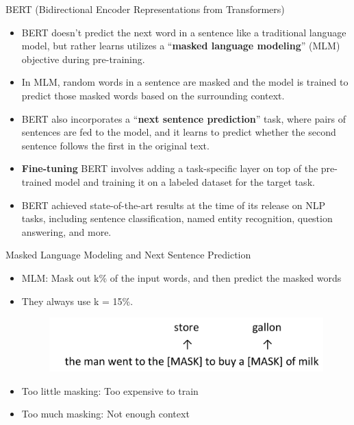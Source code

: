 \documentclass[handout]{beamer}
\begin{document}
\begin{frame}{BERT (Bidirectional Encoder Representations from Transformers)}
\begin{scriptsize}
\begin{itemize}
\item BERT  doesn't predict the next word in a sentence like a traditional language model, but rather learns utilizes a ``\textbf{masked language modeling}'' (MLM) objective during pre-training.

\item In MLM, random words in a sentence are masked and the model is trained to predict those masked words based on the surrounding context.
\item BERT also incorporates a ``\textbf{next sentence prediction}'' task, where pairs of sentences are fed to the model, and it learns to predict whether the second sentence follows the first in the original text.
\item \textbf{Fine-tuning} BERT involves adding a task-specific layer on top of the pre-trained model and training it on a labeled dataset for the target task.
\item BERT achieved state-of-the-art results at the time of its release on NLP tasks, including sentence classification, named entity recognition, question answering, and more.





\end{itemize}
\end{scriptsize}
\end{frame}


\begin{frame}{Masked Language Modeling and Next Sentence Prediction}
\begin{scriptsize}
\begin{itemize}
\item MLM: Mask out k\% of the input words, and then predict the masked words
\item They always use k = 15\%.

     \begin{figure}[h]
        	\includegraphics[scale = 0.3]{pics/MLM.png}
        \end{figure}  

\item Too little masking: Too expensive to train
\item Too much masking: Not enough context


\end{itemize}
\end{scriptsize}
\end{frame}
\end{document}

